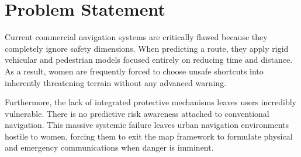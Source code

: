 \section{Problem Statement}
Current commercial navigation systems are critically flawed because they completely ignore safety dimensions. When predicting a route, they apply rigid vehicular and pedestrian models focused entirely on reducing time and distance. As a result, women are frequently forced to choose unsafe shortcuts into inherently threatening terrain without any advanced warning. 

Furthermore, the lack of integrated protective mechanisms leaves users incredibly vulnerable. There is no predictive risk awareness attached to conventional navigation. This massive systemic failure leaves urban navigation environments hostile to women, forcing them to exit the map framework to formulate physical and emergency communications when danger is imminent.
